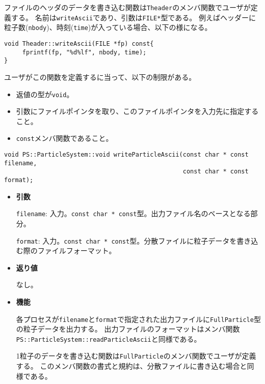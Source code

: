 \begin{itemize}
ファイルのヘッダのデータを書き込む関数は{\tt Theader}のメンバ関数でユーザが定義する。
名前は{\tt writeAscii}であり、引数は{\tt FILE*}型である。
例えばヘッダーに粒子数(\verb|nbody|)、時刻(\verb|time|)が入っている場合、以下の様になる。

\begin{verbatim}
void Theader::writeAscii(FILE *fp) const{
     fprintf(fp, "%d%lf", nbody, time);
}
\end{verbatim}

ユーザがこの関数を定義するに当って、以下の制限がある。
\begin{itemize}
\item 返値の型が\verb|void|。
\item 引数にファイルポインタを取り、このファイルポインタを入力先に指定すること。
\item \verb|const|メンバ関数であること。
\end{itemize}

\end{itemize}


\begin{screen}
\begin{verbatim}
void PS::ParticleSystem::void writeParticleAscii(const char * const filename,
                                                 const char * const format);
\end{verbatim}
\end{screen}

\begin{itemize}

\item{{\bf 引数}}

{\tt filename}: 入力。{\tt const char * const}型。出力ファイル名のベースとなる部分。

{\tt format}: 入力。{\tt const char * const}型。分散ファイルに粒子データを書き込む際のファイルフォーマット。

\item{{\bf 返り値}}

なし。

\item{{\bf 機能}}

各プロセスが{\tt filename}と{\tt format}で指定された出力ファイルに{\tt FullParticle}型の粒子データを出力する。
出力ファイルのフォーマットはメンバ関数\verb|PS::ParticleSystem::readParticleAscii|と同様である。

1粒子のデータを書き込む関数は{\tt FullParticle}のメンバ関数でユーザが定義する。
このメンバ関数の書式と規約は、分散ファイルに書き込む場合と同様である。

\end{itemize}

